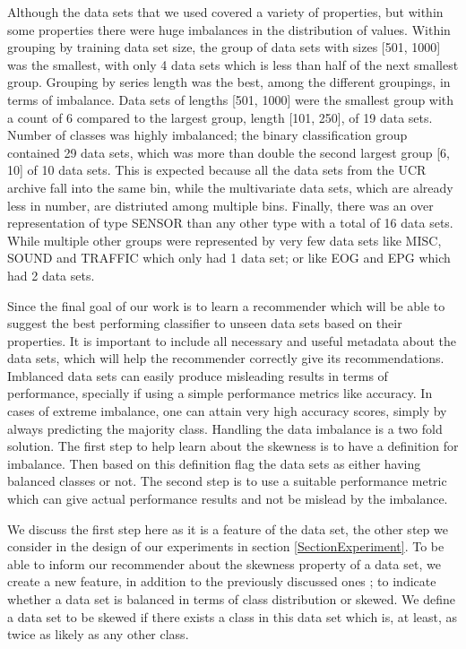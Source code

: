 Although the data sets that we used covered a variety of properties, but within some properties there were huge imbalances in the distribution of values.
Within grouping by training data set size, the group of data sets with sizes [501, 1000] was the smallest, with only 4 data sets which is less than half of the next smallest group.
Grouping by series length was the best, among the different groupings, in terms of imbalance. Data sets of lengths [501, 1000] were the smallest group with a count of 6 compared to the largest group, length [101, 250], of 19 data sets.
Number of classes was highly imbalanced; the binary classification group contained 29 data sets, which was more than double the second largest group [6, 10] of 10 data sets.
This is expected because all the data sets from the UCR archive fall into the same bin, while the multivariate data sets, which are already less in number, are distriuted among multiple bins.
Finally, there was an over representation of type SENSOR than any other type with a total of 16 data sets.
While multiple other groups were represented by very few data sets like MISC, SOUND and TRAFFIC which only had 1 data set; or like EOG and EPG which had 2 data sets.


Since the final goal of our work is to learn a recommender which will be able to suggest the best performing classifier to unseen data sets based on their properties.
It is important to include all necessary and useful metadata about the data sets, which will help the recommender correctly give its recommendations.
Imblanced data sets can easily produce misleading results in terms of performance, specially if using a simple performance metrics like accuracy.
In cases of extreme imbalance, one can attain very high accuracy scores, simply by always predicting the majority class.
Handling the data imbalance is a two fold solution.
The first step to help learn about the skewness is to have a definition for imbalance. Then based on this definition flag the data sets as either having balanced classes or not.
The second step is to use a suitable performance metric which can give actual performance results and not be mislead by the imbalance.

We discuss the first step here as it is a feature of the data set, the other step we consider in the design of our experiments in section \ref{SectionExperiment}.
To be able to inform our recommender about the skewness property of a data set, we create a new feature, in addition to the previously discussed ones ; to indicate whether a data set is balanced in terms of class distribution or skewed.
We define a data set to be skewed if there exists a class in this data set which is, at least, as twice as likely as any other class.

